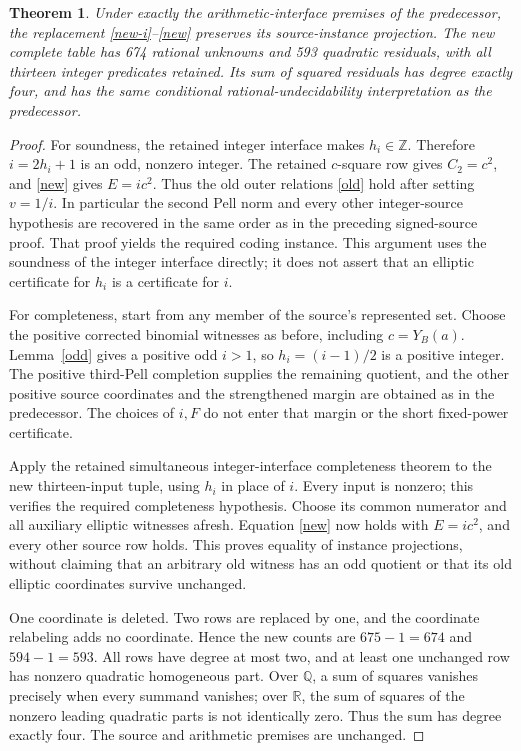 \documentclass[11pt]{article}
\newtheorem{theorem}{Theorem}
\newcommand{\Z}{\mathbb Z}\newcommand{\Q}{\mathbb Q}
\begin{document}
\begin{theorem}\label{projection}
Under exactly the arithmetic-interface premises of the predecessor,
the replacement \eqref{new-i}--\eqref{new} preserves its source-instance
projection. The new complete table has 674 rational unknowns and 593
quadratic residuals, with all thirteen integer predicates retained.
Its sum of squared residuals has degree exactly four, and has the same
conditional rational-undecidability interpretation as the predecessor.
\end{theorem}
\begin{proof}
For soundness, the retained integer interface makes \(h_i\in\Z\).
Therefore \(i=2h_i+1\) is an odd, nonzero integer. The retained
\(c\)-square row gives \(C_2=c^2\), and \eqref{new} gives
\(E=ic^2\). Thus the old outer relations \eqref{old} hold after
setting \(v=1/i\). In particular the second Pell norm and every
other integer-source hypothesis are recovered in the same order as
in the preceding signed-source proof. That proof yields the required
coding instance. This argument uses the soundness of the integer
interface directly; it does not assert that an elliptic certificate
for \(h_i\) is a certificate for \(i\).

For completeness, start from any member of the source's represented
set. Choose the positive corrected binomial witnesses as before,
including \(c=Y_B(a)\). Lemma~\ref{odd} gives a positive odd
\(i>1\), so \(h_i=(i-1)/2\) is a positive integer.
The positive third-Pell completion supplies the remaining quotient,
and the other positive source coordinates and the strengthened
margin are obtained as in the predecessor. The choices of \(i,F\)
do not enter that margin or the short fixed-power certificate.

Apply the retained simultaneous integer-interface completeness theorem
to the new thirteen-input tuple, using \(h_i\) in place of \(i\).
Every input is nonzero; this verifies the required completeness
hypothesis. Choose its common numerator and all auxiliary elliptic
witnesses afresh. Equation \eqref{new} now holds with \(E=ic^2\),
and every other source row holds. This proves equality of instance
projections, without claiming that an arbitrary old witness has an
odd quotient or that its old elliptic coordinates survive unchanged.

One coordinate is deleted. Two rows are replaced by one, and the
coordinate relabeling adds no coordinate. Hence the new counts are
\(675-1=674\) and \(594-1=593\). All rows have degree at most
two, and at least one unchanged row has nonzero quadratic homogeneous
part. Over \(\Q\), a sum of squares vanishes precisely when every
summand vanishes; over \(\mathbb R\), the sum of squares of the
nonzero leading quadratic parts is not identically zero. Thus the sum
has degree exactly four. The source and arithmetic premises are
unchanged.
\end{proof}
\end{document}
